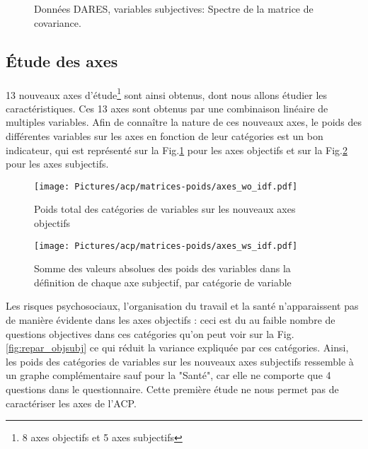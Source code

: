 \documentclass[11pt,fleqn,openany,frenchb]{book} %
\begin{document}
\begin{figure}[!h]
    \centering
  \hspace{2pt}
  \caption{Données DARES, variables subjectives: Spectre de la matrice de covariance.}
\end{figure}

\subsection{\'Etude des axes }
\paragraph{}
13 nouveaux axes d'étude\footnote{8 axes objectifs et 5 axes subjectifs} sont ainsi obtenus, dont nous allons étudier les caractéristiques. Ces 13 axes sont obtenus par une combinaison linéaire de multiples variables. Afin de connaître la nature de ces nouveaux axes, le poids des différentes variables sur les axes en fonction de leur catégories est un bon indicateur, qui est représenté sur la Fig.\ref{fig:ACPobj} pour les axes objectifs et sur la Fig.\ref{fig:ACPsubj} pour les axes subjectifs. 
\begin{figure}[!h]
    \centering
  \texttt{[image: Pictures/acp/matrices-poids/axes\_wo\_idf.pdf]}
    \caption{Poids total des catégories de variables sur les nouveaux axes objectifs}
    \label{fig:ACPobj}
\end{figure}


\begin{figure}[!h]
  \centering
  \texttt{[image: Pictures/acp/matrices-poids/axes\_ws\_idf.pdf]}
  \caption{Somme des valeurs absolues des poids des variables dans la définition de chaque axe subjectif, par catégorie de variable}
  \label{fig:ACPsubj}
\end{figure}

Les risques psychosociaux, l'organisation du travail et la santé n'apparaissent pas de manière évidente dans les axes objectifs : ceci est du au faible nombre de questions objectives dans ces catégories qu'on peut voir sur la Fig.\ref{fig:repar_objsubj} ce qui réduit la variance expliquée par ces catégories. Ainsi, les poids des catégories de variables sur les nouveaux axes subjectifs ressemble à un graphe complémentaire sauf pour la "Santé", car elle ne comporte que 4 questions dans le questionnaire. Cette première étude ne nous permet pas de caractériser les axes de l'ACP.%
\end{document}
